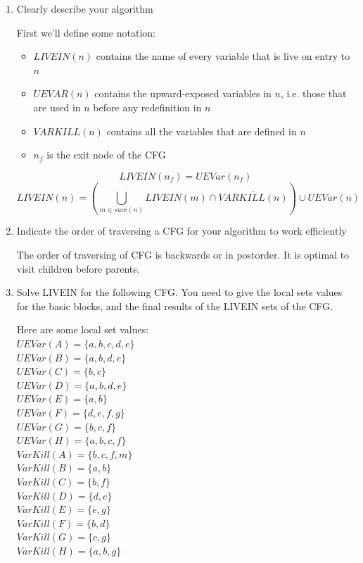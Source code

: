 \documentclass[11pt]{article}
\begin{document}
\begin{enumerate}
	\item Clearly describe your algorithm
		\begin{Answer}
		First we'll define some notation:
		\begin{itemize}
			\item $LIVEIN(n)$ contains the name of every variable that is live on entry to $n$
			\item $UEVAR(n)$ contains the upward-exposed variables in $n$, i.e. those that are used in $n$ before any redefinition in $n$
			\item $VARKILL(n)$ contains all the variables that are defined in $n$
			\item $n_f$ is the exit node of the CFG
		\end{itemize}
		$$LIVEIN(n_f) = UEVar(n_f)$$
		$$LIVEIN(n) = (\bigcup_{m \in succ(n)} LIVEIN(m) \cap \overline{VARKILL(n)}) \cup UEVar(n)$$
		\end{Answer}
	\item Indicate the order of traversing a CFG for your algorithm to work efficiently
		\begin{Answer}
		The order of traversing of CFG is backwards or in postorder. It is optimal to visit children before parents.
		\end{Answer}
	\item Solve LIVEIN for the following CFG. You need to give the local sets values for the basic
blocks, and the final results of the LIVEIN sets of the CFG.
		\begin{Answer}
		Here are some local set values: \\
		$UEVar(A) = \{a, b, c, d, e\}$ \\
		$UEVar(B) = \{a, b, d, e\}$ \\
		$UEVar(C) = \{b, c\}$ \\
		$UEVar(D) = \{a, b, d, e\}$ \\
		$UEVar(E) = \{a, b\}$ \\
		$UEVar(F) = \{d, e, f, g\}$ \\
		$UEVar(G) = \{b, c, f\}$ \\
		$UEVar(H) = \{a, b, c, f\}$ \\
		
		$VarKill(A) = \{b, c, f, m\}$ \\
		$VarKill(B) = \{a, b\}$ \\
		$VarKill(C) = \{b, f\}$ \\
		$VarKill(D) = \{d, e\}$ \\
		$VarKill(E) = \{e, g\}$ \\
		$VarKill(F) = \{b, d\}$ \\
		$VarKill(G) = \{c, g\}$ \\
		$VarKill(H) = \{a, b, g\}$ \\
		

\end{Answer}
\end{enumerate}
\end{document}
